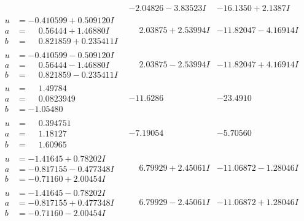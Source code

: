 \documentclass[1p]{elsarticle_modified}
\theoremstyle{definition}
\begin{document}
$$\begin{array}{c|c|c}
 & -2.04826 - 3.83523 I & -16.1350 + 2.1387 I \\ \hline\begin{aligned}
u &= -0.410599 + 0.509120 I \\
a &= \phantom{-}0.56444 + 1.46880 I \\
b &= \phantom{-}0.821859 + 0.235411 I\end{aligned}
 & \phantom{-}2.03875 + 2.53994 I & -11.82047 - 4.16914 I \\ \hline\begin{aligned}
u &= -0.410599 - 0.509120 I \\
a &= \phantom{-}0.56444 - 1.46880 I \\
b &= \phantom{-}0.821859 - 0.235411 I\end{aligned}
 & \phantom{-}2.03875 - 2.53994 I & -11.82047 + 4.16914 I \\ \hline\begin{aligned}
u &= \phantom{-}1.49784\phantom{ +0.000000I} \\
a &= \phantom{-}0.0823949\phantom{ +0.000000I} \\
b &= -1.05480\phantom{ +0.000000I}\end{aligned}
 & -11.6286\phantom{ +0.000000I} & -23.4910\phantom{ +0.000000I} \\ \hline\begin{aligned}
u &= \phantom{-}0.394751\phantom{ +0.000000I} \\
a &= \phantom{-}1.18127\phantom{ +0.000000I} \\
b &= \phantom{-}1.60965\phantom{ +0.000000I}\end{aligned}
 & -7.19054\phantom{ +0.000000I} & -5.70560\phantom{ +0.000000I} \\ \hline\begin{aligned}
u &= -1.41645 + 0.78202 I \\
a &= -0.817155 - 0.477348 I \\
b &= -0.71160 + 2.00454 I\end{aligned}
 & \phantom{-}6.79929 + 2.45061 I & -11.06872 - 1.28046 I \\ \hline\begin{aligned}
u &= -1.41645 - 0.78202 I \\
a &= -0.817155 + 0.477348 I \\
b &= -0.71160 - 2.00454 I\end{aligned}
 & \phantom{-}6.79929 - 2.45061 I & -11.06872 + 1.28046 I \\ \hline\begin{aligned}

\end{aligned}
\end{array}$$
\end{document}
